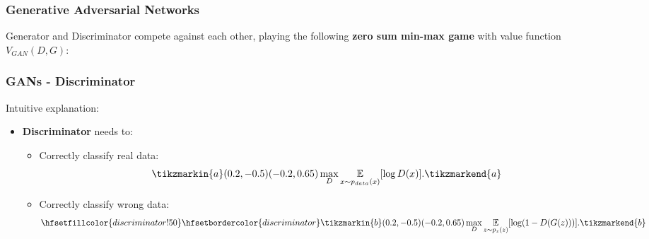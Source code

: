 \documentclass{beamer}
\begin{document}
\begin{frame}
\frametitle{Generative Adversarial Networks}
Generator and Discriminator compete against each other, playing the following \textbf{zero sum min-max game} with value function $V_{GAN}(D,G)$:



\end{frame}

\begin{frame}
\frametitle{GANs - Discriminator}
Intuitive explanation:
\begin{itemize}
	\item \textbf{Discriminator} needs to:
	\begin{itemize}
		\item Correctly classify real data: \\  \begin{equation} \tikzmarkin{a}(0.2,-0.5)(-0.2,0.65) \max_D \underset{x \sim p_{data}(x)}{\mathbb{E}} [\log D(x)].\tikzmarkend{a}
		\end{equation}
		\item Correctly classify wrong data: \\  \begin{equation}
		\hfsetfillcolor{discriminator!50}
		\hfsetbordercolor{discriminator} \tikzmarkin{b}(0.2,-0.5)(-0.2,0.65) \max_D  \underset{z \sim p_z(z)}{\mathbb{E}}[\log(1 - D(G(z)))].\tikzmarkend{b} \end{equation}
	\end{itemize}
\end{itemize}
\end{frame}
\end{document}
